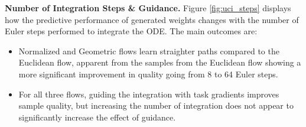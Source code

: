 \textbf{Number of Integration Steps \& Guidance.} Figure \ref{fig:uci_steps} displays how the predictive performance of generated weights changes with the number of Euler steps performed to integrate the ODE. The main outcomes are:
\begin{itemize}
    \item Normalized and Geometric flows learn straighter paths compared to the Euclidean flow, apparent from the samples from the Euclidean flow showing a more significant improvement in quality going from 8 to 64 Euler steps. 
    \item For all three flows, guiding the integration with task gradients improves sample quality, but increasing the number of integration does not appear to significantly increase the effect of guidance. 
\end{itemize}



